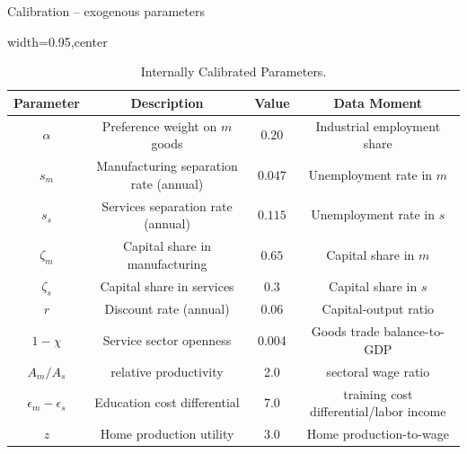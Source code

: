 \documentclass[9pt,xcolor={svgnames}]{beamer}
\begin{document}
\begin{frame}{Calibration -- exogenous parameters}
\begin{table}[h!]
\centering
\caption{Internally Calibrated Parameters.}\label{table_calibrated_parameters}
\begin{adjustbox}{width=0.95\columnwidth,center}
\begin{tabular}{||c c c c||}\hline
\textbf{Parameter} & \textbf{Description} & \textbf{Value} & Data Moment \\\hline\hline
$\alpha$ & Preference weight on $m$ goods & $0.20$ & Industrial employment share \\
$s_m$ & Manufacturing separation rate (annual) & $0.047$ & Unemployment rate in $m$  \\
$s_s$ & Services separation rate (annual) & $0.115$ & Unemployment rate in $s$ \\
$\zeta_m$ & Capital share in manufacturing & $0.65$ & Capital share in $m$\\
$\zeta_s$ & Capital share in services & $0.3$ &  Capital share in $s$ \\
$r$ & Discount rate (annual) & $0.06$ & Capital-output ratio \\
$1-\chi$ & Service sector openness & 0.004 & Goods trade balance-to-GDP \\
$A_m/A_s$   & relative productivity & 2.0  &   sectoral wage ratio\\
$\epsilon_m-\epsilon_s$ & Education cost differential & 7.0 &  training cost differential/labor income \\ 
$z$  & Home production utility  & 3.0 & Home production-to-wage
\\\hline
\end{tabular}
\end{adjustbox}
\end{table}



\end{frame}


\end{document}
